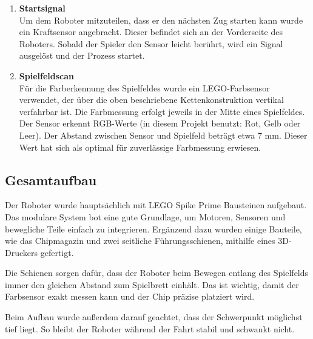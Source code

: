 \begin{enumerate}
	\item \textbf{Startsignal}\\
	Um dem Roboter mitzuteilen, dass er den nächsten Zug starten kann wurde ein Kraftsensor angebracht. Dieser befindet sich an der Vorderseite des Roboters. Sobald der Spieler den Sensor leicht berührt, wird ein Signal ausgelöst und der Prozess startet. 
	\item \textbf{Spielfeldscan }\\
	 Für die Farberkennung des Spielfeldes wurde ein LEGO-Farbsensor verwendet, der über die oben beschriebene Kettenkonstruktion vertikal verfahrbar ist. Die Farbmessung erfolgt jeweils in der Mitte eines Spielfeldes. Der Sensor erkennt RGB-Werte (in diesem Projekt benutzt: Rot, Gelb oder Leer). Der Abstand zwischen Sensor und Spielfeld beträgt etwa 7 mm. Dieser Wert hat sich als optimal für zuverlässige Farbmessung erwiesen.
\end{enumerate}

\subsection{Gesamtaufbau}
Der Roboter wurde hauptsächlich mit LEGO Spike Prime Bausteinen aufgebaut. Das modulare System bot eine gute Grundlage, um Motoren, Sensoren und bewegliche Teile einfach zu integrieren. Ergänzend dazu wurden einige Bauteile, wie das Chipmagazin und zwei seitliche Führungsschienen, mithilfe eines 3D-Druckers gefertigt.

Die Schienen sorgen dafür, dass der Roboter beim Bewegen entlang des Spielfelds immer den gleichen Abstand zum Spielbrett einhält. Das ist wichtig, damit der Farbsensor exakt messen kann und der Chip präzise platziert wird.

Beim Aufbau wurde außerdem darauf geachtet, dass der Schwerpunkt möglichst tief liegt. So bleibt der Roboter während der Fahrt stabil und schwankt nicht.

